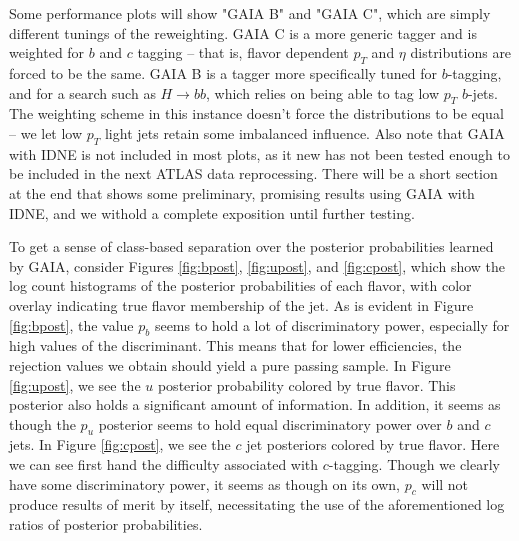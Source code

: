 Some performance plots will show "GAIA B" and "GAIA C", which are simply different tunings of the reweighting. GAIA C is a more generic tagger and is weighted for $b$ and $c$ tagging -- that is, flavor dependent $p_T$ and $\eta$ distributions are forced to be the same. GAIA B is a tagger more specifically tuned for $b$-tagging, and for a search such as $H\longrightarrow bb$, which relies on being able to tag low $p_T$ $b$-jets. The weighting scheme in this instance doesn't force the distributions to be equal -- we let low $p_T$ light jets retain some imbalanced influence. Also note that GAIA with IDNE is not included in most plots, as it new has not been tested enough to be included in the next ATLAS data reprocessing. There will be a short section at the end that shows some preliminary, promising results using GAIA with IDNE, and we withold a complete exposition until further testing. 

To get a sense of class-based separation over the posterior probabilities learned by GAIA, consider Figures \ref{fig:bpost}, \ref{fig:upost}, and \ref{fig:cpost}, which show the log count histograms of the posterior probabilities of each flavor, with color overlay indicating true flavor membership of the jet. As is evident in Figure \ref{fig:bpost}, the value $p_b$ seems to hold a lot of discriminatory power, especially for high values of the discriminant. This means that for lower efficiencies, the rejection values we obtain should yield a pure passing sample. In Figure \ref{fig:upost}, we see the $u$ posterior probability colored by true flavor. This posterior also holds a significant amount of information. In addition, it seems as though the $p_u$ posterior seems to hold equal discriminatory power over $b$ and $c$ jets. In Figure \ref{fig:cpost}, we see the $c$ jet posteriors colored by true flavor. Here we can see first hand the difficulty associated with $c$-tagging. Though we clearly have some discriminatory power, it seems as though on its own, $p_c$ will not produce results of merit by itself, necessitating the use of the aforementioned log ratios of posterior probabilities. 



